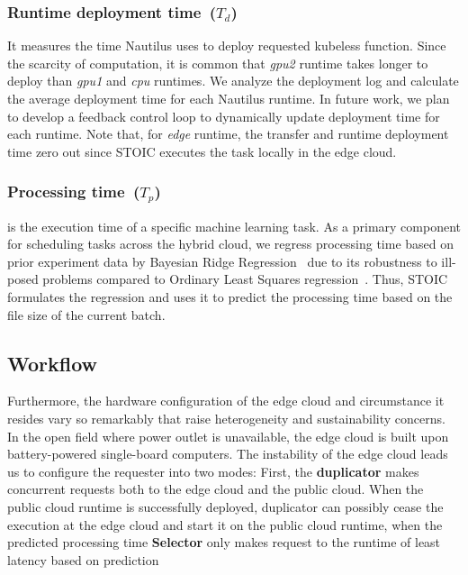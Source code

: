 \subsubsection{Runtime deployment time~($T_d$)} It measures the time Nautilus uses to deploy requested kubeless function. Since the scarcity of computation, it is common that \textit{gpu2} runtime takes longer to deploy than \textit{gpu1} and \textit{cpu} runtimes. We analyze the deployment log and calculate the average deployment time for each Nautilus runtime. In future work, we plan to develop a feedback control loop to dynamically update deployment time for each runtime. Note that, for \textit{edge} runtime, the transfer and runtime deployment time zero out since STOIC executes the task locally in the edge cloud.
 
 \subsubsection{Processing time~($T_p$)} is the execution time of a specific machine learning task. As a primary component for scheduling tasks across the hybrid cloud, we regress processing time based on prior experiment data by Bayesian Ridge Regression~\cite{ref:brr} due to its robustness to ill-posed problems compared to Ordinary Least Squares regression~\cite{ref:ols}. Thus, STOIC formulates the regression and uses it to predict the processing time based on the file size of the current batch. %
 
 \subsection{Workflow}
 
 Furthermore, the hardware configuration of the edge cloud and circumstance it resides vary so remarkably that raise heterogeneity and sustainability concerns. In the open field where power outlet is unavailable, the edge cloud is built upon battery-powered single-board computers. The instability of the edge cloud leads us to configure the requester into two modes: First, the \textbf{duplicator} makes concurrent requests both to the edge cloud and the public cloud. When the public cloud runtime is successfully deployed, duplicator can possibly cease the execution at the edge cloud and start it on the public cloud runtime, when the predicted processing time \textbf{Selector} only makes request to the runtime of least latency based on prediction

